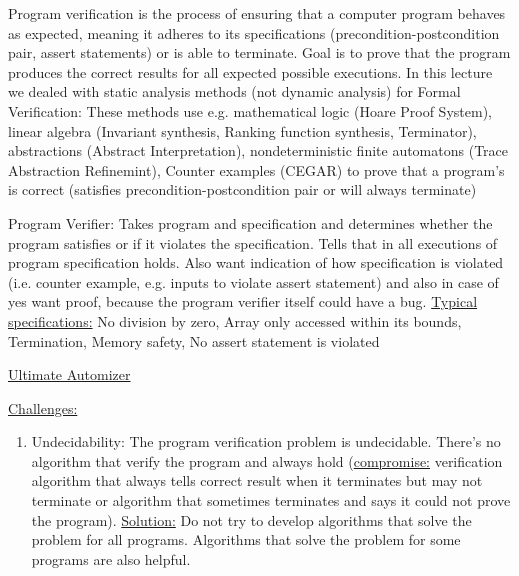 \documentclass[landscape, a4paper]{article}
\begin{document}
\fontsize{3pt}{3pt}\selectfont

\begin{minipage}[t]{0.2\linewidth}
	  
	\begin{betterlist}
		\item Program verification is the process of ensuring that a computer program behaves as expected, meaning it adheres to its specifications (precondition-postcondition pair, assert statements) or is able to terminate. Goal is to prove that the program produces the correct results for all expected possible executions. In this lecture we dealed with static analysis methods (not dynamic analysis) for Formal Verification: These methods use e.g. mathematical logic (Hoare Proof System), linear algebra (Invariant synthesis, Ranking function synthesis, Terminator), \alert{abstractions (Abstract Interpretation)}, \alert{nondeterministic finite automatons (Trace Abstraction Refinemint)}, \alert{Counter examples (CEGAR)} to prove that a program's is correct (satisfies precondition-postcondition pair or will always terminate)
		\item \alert{Program Verifier:} Takes program and specification and determines whether the program satisfies or if it violates the specification. Tells that in all executions of program specification holds. Also want indication of how specification is violated (i.e. counter example, e.g. inputs to violate assert statement) and also in case of yes want proof, because the program verifier itself could have a bug. \underline{Typical specifications:} No division by zero, Array only accessed within its bounds, Termination, Memory safety, No assert statement is violated
		\item \href{https://ultimate-pa.org/?ui=tool&tool=automizer}{Ultimate Automizer}
		\item \underline{Challenges:}
		\begin{enumerate}
			\item \alert{Undecidability:} The program verification problem is undecidable. There's no algorithm that verify the program and always hold (\underline{compromise:} verification algorithm that always tells correct result when it terminates but may not terminate or algorithm that sometimes terminates and says it could not prove the program). \underline{Solution:} Do not try to develop algorithms that solve the problem for all programs. Algorithms that solve the problem for some programs are also helpful.

\end{enumerate}
\end{betterlist}
\end{minipage}
\end{document}
